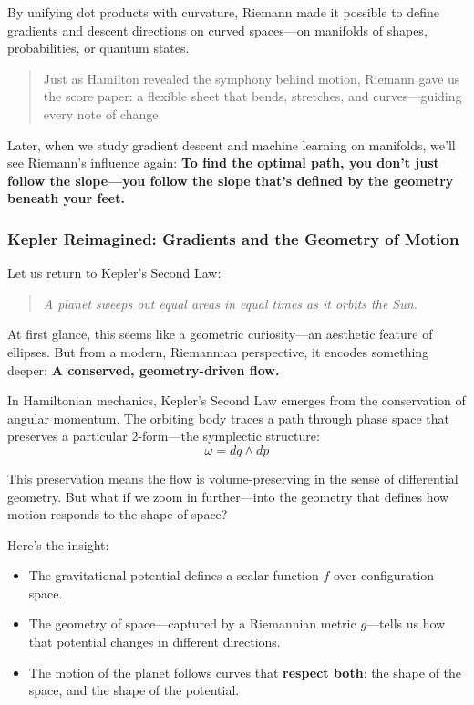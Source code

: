 By unifying dot products with curvature, Riemann made it possible to define gradients and descent directions on curved spaces—on manifolds of shapes, probabilities, or quantum states.

\begin{quote}
Just as Hamilton revealed the symphony behind motion,  
Riemann gave us the score paper: a flexible sheet that bends, stretches, and curves—guiding every note of change.
\end{quote}

Later, when we study gradient descent and machine learning on manifolds, we’ll see Riemann’s influence again:  
\textbf{To find the optimal path, you don’t just follow the slope—you follow the slope that’s defined by the geometry beneath your feet.}


\subsubsection*{Kepler Reimagined: Gradients and the Geometry of Motion}

Let us return to Kepler’s Second Law:

\begin{quote}
\textit{A planet sweeps out equal areas in equal times as it orbits the Sun.}
\end{quote}

At first glance, this seems like a geometric curiosity—an aesthetic feature of ellipses.  
But from a modern, Riemannian perspective, it encodes something deeper:  
\textbf{A conserved, geometry-driven flow.}

In Hamiltonian mechanics, Kepler’s Second Law emerges from the conservation of angular momentum. The orbiting body traces a path through phase space that preserves a particular 2-form—the symplectic structure:
\[
\omega = dq \wedge dp
\]

This preservation means the flow is volume-preserving in the sense of differential geometry. But what if we zoom in further—into the geometry that defines how motion responds to the shape of space?

Here’s the insight:

\begin{itemize}
  \item The gravitational potential defines a scalar function \( f \) over configuration space.
  \item The geometry of space—captured by a Riemannian metric \( g \)—tells us how that potential changes in different directions.
  \item The motion of the planet follows curves that \textbf{respect both}: the shape of the space, and the shape of the potential.
\end{itemize}

